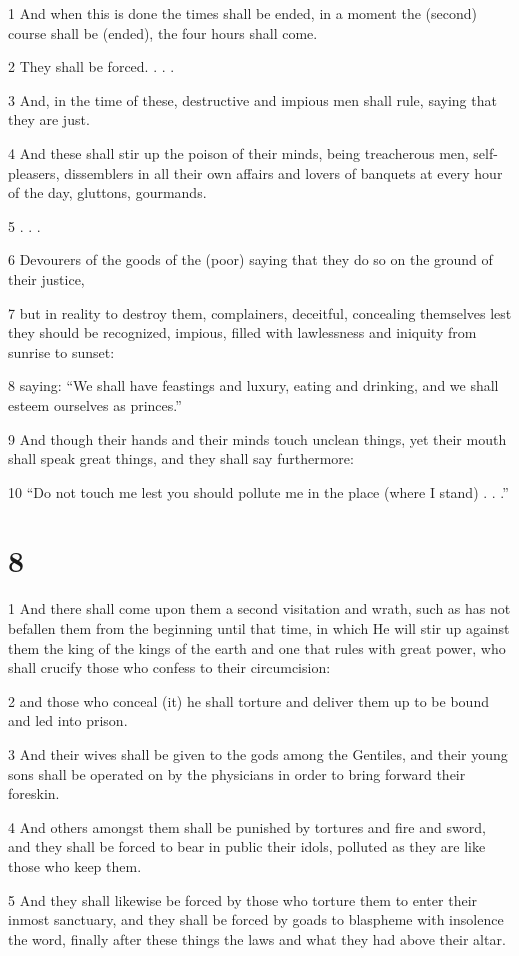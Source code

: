 \par 1 And when this is done the times shall be ended, in a moment the (second) course shall be (ended), the four hours shall come.
\par 2 They shall be forced. . . .
\par 3 And, in the time of these, destructive and impious men shall rule, saying that they are just.
\par 4 And these shall stir up the poison of their minds, being treacherous men, self-pleasers, dissemblers in all their own affairs and lovers of banquets at every hour of the day, gluttons, gourmands.
\par 5 . . . 
\par 6 Devourers of the goods of the (poor) saying that they do so on the ground of their justice,
\par 7 but in reality to destroy them, complainers, deceitful, concealing themselves lest they should be recognized, impious, filled with lawlessness and iniquity from sunrise to sunset:
\par 8 saying: “We shall have feastings and luxury, eating and drinking, and we shall esteem ourselves as princes.”
\par 9 And though their hands and their minds touch unclean things, yet their mouth shall speak great things, and they shall say furthermore:
\par 10 “Do not touch me lest you should pollute me in the place (where I stand) . . .”

\chapter{8}

\par 1 And there shall come upon them a second visitation and wrath, such as has not befallen them from the beginning until that time, in which He will stir up against them the king of the kings of the earth and one that rules with great power, who shall crucify those who confess to their circumcision:
\par 2 and those who conceal (it) he shall torture and deliver them up to be bound and led into prison.
\par 3 And their wives shall be given to the gods among the Gentiles, and their young sons shall be operated on by the physicians in order to bring forward their foreskin.
\par 4 And others amongst them shall be punished by tortures and fire and sword, and they shall be forced to bear in public their idols, polluted as they are like those who keep them.
\par 5 And they shall likewise be forced by those who torture them to enter their inmost sanctuary, and they shall be forced by goads to blaspheme with insolence the word, finally after these things the laws and what they had above their altar.


